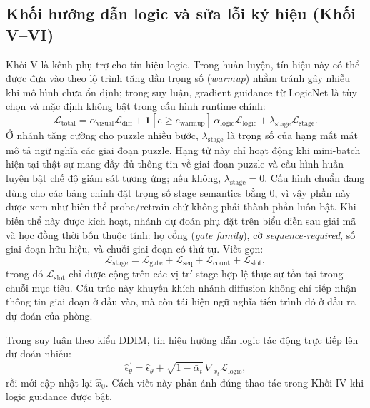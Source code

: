\documentclass[oneside,a4paper,12pt]{extreport}
\begin{document}
\subsection{Khối hướng dẫn logic và sửa lỗi ký hiệu (Khối V--VI)}
Khối V là kênh phụ trợ cho tín hiệu logic. Trong huấn luyện, tín hiệu này có thể được đưa vào theo lộ trình tăng dần trọng số (\emph{warmup}) nhằm tránh gây nhiễu khi mô hình chưa ổn định; trong suy luận, gradient guidance từ LogicNet là tùy chọn và mặc định không bật trong cấu hình runtime chính:
\begin{equation}
\mathcal{L}_{\text{total}} = \alpha_{\text{visual}}\mathcal{L}_{\text{diff}} +
\mathbf{1}[e \ge e_{\text{warmup}}] \, \alpha_{\text{logic}}\mathcal{L}_{\text{logic}} +
\lambda_{\text{stage}}\mathcal{L}_{\text{stage}}.
\end{equation}
Ở nhánh tăng cường cho puzzle nhiều bước, $\lambda_{\text{stage}}$ là trọng số của
hạng mất mát mô tả ngữ nghĩa các giai đoạn puzzle. Hạng tử này chỉ hoạt động
khi mini-batch hiện tại thật sự mang đầy đủ thông tin về giai đoạn puzzle và
cấu hình huấn luyện bật chế độ giám sát tương ứng; nếu không,
$\lambda_{\text{stage}}=0$. Cấu hình chuẩn đang dùng cho các bảng chính đặt
trọng số stage semantics bằng $0$, vì vậy phần này được xem như biến thể
probe/retrain chứ không phải thành phần luôn bật. Khi biến thể này được kích
hoạt, nhánh dự đoán phụ đặt trên biểu diễn sau giải mã và học đồng thời bốn
thuộc tính: họ cổng (\emph{gate family}), cờ \emph{sequence-required}, số giai
đoạn hữu hiệu, và chuỗi giai đoạn có thứ tự. Viết gọn:
\begin{equation}
\mathcal{L}_{\text{stage}} =
\mathcal{L}_{\text{gate}} +
\mathcal{L}_{\text{seq}} +
\mathcal{L}_{\text{count}} +
\mathcal{L}_{\text{slot}},
\end{equation}
trong đó $\mathcal{L}_{\text{slot}}$ chỉ được cộng trên các vị trí stage hợp lệ
thực sự tồn tại trong chuỗi mục tiêu. Cấu trúc này khuyến khích nhánh diffusion
không chỉ tiếp nhận thông tin giai đoạn ở đầu vào, mà còn tái hiện ngữ nghĩa
tiến trình đó ở đầu ra dự đoán của phòng.

Trong suy luận theo kiểu DDIM, tín hiệu hướng dẫn logic tác động trực tiếp lên
dự đoán nhiễu:
\begin{equation}
\hat{\epsilon}^{\,'}_\theta = \hat{\epsilon}_\theta + \sqrt{1-\bar{\alpha}_t}\,\nabla_{x_t}\mathcal{L}_{\text{logic}},
\end{equation}
rồi mới cập nhật lại $\hat{x}_0$. Cách viết này phản ánh đúng thao tác trong Khối IV khi logic guidance được bật.
\end{document}
